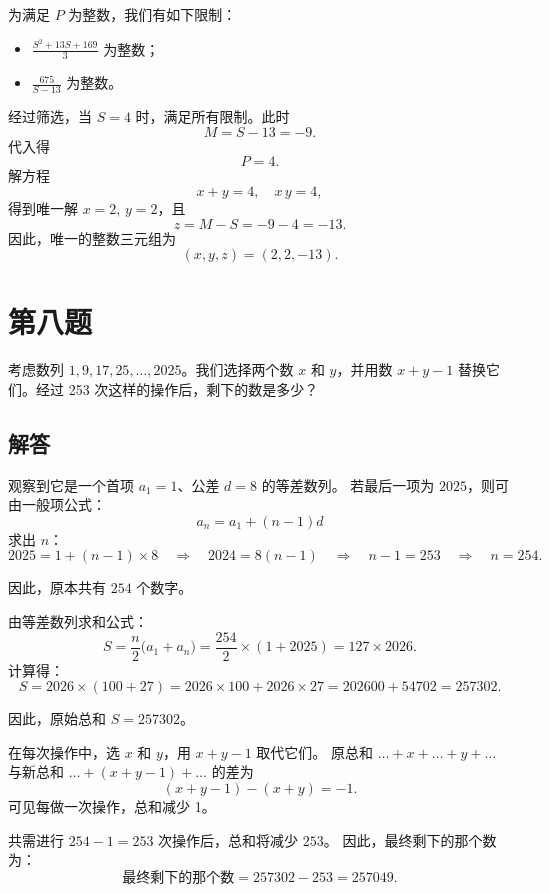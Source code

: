 \documentclass[12pt, a4paper]{article}
\theoremstyle{definition}
\theoremstyle{remark}
\begin{document}
\noindent 为满足 \(P\) 为整数，我们有如下限制：
\begin{itemize}
    \item $\frac{S^2+13 S+169}{3}$ 为整数；
    \item $\frac{675}{S-13}$ 为整数。
\end{itemize}

\noindent 经过筛选，当 \(S = 4\) 时，满足所有限制。此时
$$
M = S - 13 = -9.
$$
代入得
$$
P = 4.
$$
解方程
$$
x + y = 4, \quad x\,y = 4,
$$
得到唯一解 \(x = 2, \, y = 2\)，且
$$
z = M - S = -9 - 4 = -13.
$$
因此，唯一的整数三元组为
$$
(x, y, z) = (2, 2, -13).
$$

\newpage

\section{第八题}

\noindent 考虑数列 $1, 9, 17, 25, \ldots, 2025$。我们选择两个数 $x$ 和 $y$，并用数 $x + y - 1$ 替换它们。经过 253 次这样的操作后，剩下的数是多少？


\subsection{解答}

\noindent 观察到它是一个首项 \(a_1 = 1\)、公差 \(d = 8\) 的等差数列。  
若最后一项为 \(2025\)，则可由一般项公式：
$$
a_n = a_1 + (n - 1)d
$$
求出 \(n\)：
$$
2025 = 1 + (n - 1)\times 8
\quad\Longrightarrow\quad
2024 = 8(n - 1)
\quad\Longrightarrow\quad
n - 1 = 253
\quad\Longrightarrow\quad
n = 254.
$$

\noindent 因此，原本共有 \(254\) 个数字。

\noindent 由等差数列求和公式：
$$
S = \frac{n}{2}\bigl(a_1 + a_n\bigr) 
   = \frac{254}{2} \times (1 + 2025) 
   = 127 \times 2026.
$$
计算得：
$$
S = 2026 \times (100 + 27) 
   = 2026 \times 100 + 2026 \times 27 
   = 202600 + 54702 
   = 257302.
$$

\noindent 因此，原始总和 \(S = 257302\)。

\noindent 在每次操作中，选 \(x\) 和 \(y\)，用 \(x + y - 1\) 取代它们。  
原总和 \(\dots + x + \dots + y + \dots\) 与新总和 \(\dots + (x + y - 1) + \dots\) 的差为
$$
(x + y - 1) - (x + y) = -1.
$$
可见每做一次操作，总和减少 1。

\noindent 共需进行 \(254 - 1 = 253\) 次操作后，总和将减少 \(253\)。  
因此，最终剩下的那个数为：
$$
\text{最终剩下的那个数} 
= 257302 - 253 
= 257049.
$$
   
\end{document}
